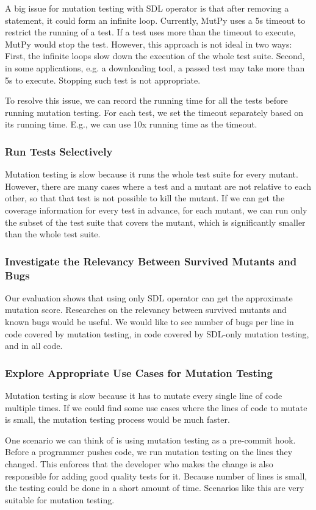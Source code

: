 \documentclass[12pt]{article}
\begin{document}
A big issue for mutation testing with SDL operator is that after removing a statement, it could form an infinite loop. Currently, MutPy uses a 5s timeout to restrict the running of a test. If a test uses more than the timeout to execute, MutPy would stop the test. However, this approach is not ideal in two ways: First, the infinite loops slow down the execution of the whole test suite. Second, in some applications, e.g. a downloading tool, a passed test may take more than 5s to execute. Stopping such test is not appropriate.

To resolve this issue, we can record the running time for all the tests before running mutation testing. For each test, we set the timeout separately based on its running time. E.g., we can use 10x running time as the timeout.

\subsubsection{Run Tests Selectively}

Mutation testing is slow because it runs the whole test suite for every mutant. However, there are many cases where a test and a mutant are not relative to each other, so that that test is not possible to kill the mutant. If we can get the coverage information for every test in advance, for each mutant, we can run only the subset of the test suite that covers the mutant, which is significantly smaller than the whole test suite.

\subsubsection{Investigate the Relevancy Between Survived Mutants and Bugs}

Our evaluation shows that using only SDL operator can get the approximate mutation score. Researches on the relevancy between survived mutants and known bugs would be useful. We would like to see number of bugs per line in code covered by mutation testing, in code covered by SDL-only mutation testing, and in all code.

\subsubsection{Explore Appropriate Use Cases for Mutation Testing}

Mutation testing is slow because it has to mutate every single line of code multiple times. If we could find some use cases where the lines of code to mutate is small, the mutation testing process would be much faster.

One scenario we can think of is using mutation testing as a pre-commit hook. Before a programmer pushes code, we run mutation testing on the lines they changed. This enforces that the developer who makes the change is also responsible for adding good quality tests for it. Because number of lines is small, the testing could be done in a short amount of time. Scenarios like this are very suitable for mutation testing.

\begin{appendices}
\end{appendices}



\end{document}

